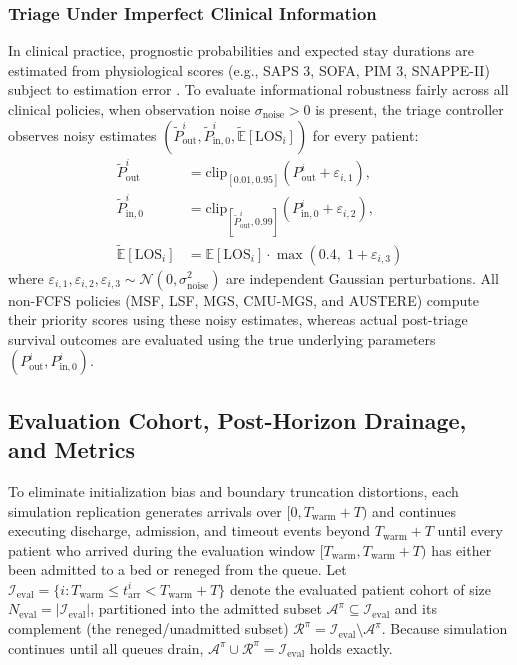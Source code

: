 \documentclass[final,5p,times,twocolumn]{elsarticle}
\begin{document}
\subsubsection{Triage Under Imperfect Clinical Information}
In clinical practice, prognostic probabilities and expected stay durations are estimated from physiological scores (e.g., SAPS 3, SOFA, PIM 3, SNAPPE-II) subject to estimation error \cite{argon2009priority, Frej_2023}. To evaluate informational robustness fairly across all clinical policies, when observation noise $\sigma_{\text{noise}} > 0$ is present, the triage controller observes noisy estimates $(\widetilde{P}_{\text{out}}^i, \widetilde{P}_{\text{in},0}^i, \widetilde{\mathbb{E}}[\text{LOS}_i])$ for every patient:
\begin{align}
    \widetilde{P}_{\text{out}}^i &= \text{clip}_{[0.01, 0.95]}\!\left( P_{\text{out}}^i + \varepsilon_{i,1} \right), \nonumber \\
    \widetilde{P}_{\text{in},0}^i &= \text{clip}_{[\widetilde{P}_{\text{out}}^i, 0.99]}\!\left( P_{\text{in},0}^i + \varepsilon_{i,2} \right), \label{eq:noisy_inputs} \\
    \widetilde{\mathbb{E}}[\text{LOS}_i] &= \mathbb{E}[\text{LOS}_i] \cdot \max\!\left(0.4,\; 1 + \varepsilon_{i,3}\right) \nonumber
\end{align}
where $\varepsilon_{i,1}, \varepsilon_{i,2}, \varepsilon_{i,3} \sim \mathcal{N}(0, \sigma_{\text{noise}}^2)$ are independent Gaussian perturbations. All non-FCFS policies (MSF, LSF, MGS, CMU-MGS, and AUSTERE) compute their priority scores using these noisy estimates, whereas actual post-triage survival outcomes are evaluated using the true underlying parameters $(P_{\text{out}}^i, P_{\text{in},0}^i)$.

\subsection{Evaluation Cohort, Post-Horizon Drainage, and Metrics}

To eliminate initialization bias and boundary truncation distortions, each simulation replication generates arrivals over $[0, T_{\text{warm}} + T)$ and continues executing discharge, admission, and timeout events beyond $T_{\text{warm}} + T$ until every patient who arrived during the evaluation window $[T_{\text{warm}}, T_{\text{warm}} + T)$ has either been admitted to a bed or reneged from the queue. Let $\mathcal{I}_{\text{eval}} = \{i : T_{\text{warm}} \le t_{\text{arr}}^i < T_{\text{warm}} + T\}$ denote the evaluated patient cohort of size $N_{\text{eval}} = |\mathcal{I}_{\text{eval}}|$, partitioned into the admitted subset $\mathcal{A}^{\pi} \subseteq \mathcal{I}_{\text{eval}}$ and its complement (the reneged/unadmitted subset) $\mathcal{R}^{\pi} = \mathcal{I}_{\text{eval}} \setminus \mathcal{A}^{\pi}$. Because simulation continues until all queues drain, $\mathcal{A}^{\pi} \cup \mathcal{R}^{\pi} = \mathcal{I}_{\text{eval}}$ holds exactly.
\end{document}
